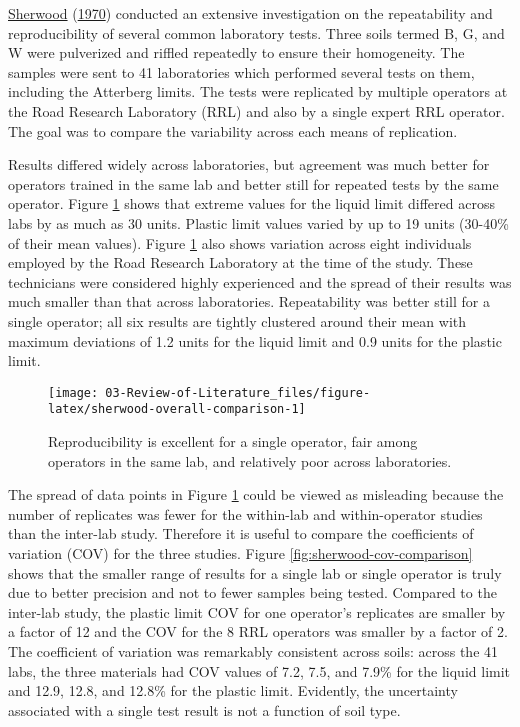 \documentclass[
  letterpaper,
  openany]{book}
\begin{document}
\protect\hyperlink{ref-Sherwood1970}{Sherwood} (\protect\hyperlink{ref-Sherwood1970}{1970}) conducted an extensive investigation on the repeatability and reproducibility of several common laboratory tests.
Three soils termed B, G, and W were pulverized and riffled repeatedly to ensure their homogeneity. The samples were sent to 41 laboratories which performed several tests on them, including the Atterberg limits.
The tests were replicated by multiple operators at the Road Research Laboratory (RRL) and also by a single expert RRL operator.
The goal was to compare the variability across each means of replication.

Results differed widely across laboratories, but agreement was much better for operators trained in the same lab and better still for repeated tests by the same operator.
Figure \ref{fig:sherwood-overall-comparison} shows that extreme values for the liquid limit differed across labs by as much as 30 units.
Plastic limit values varied by up to 19 units (30-40\% of their mean values).
Figure \ref{fig:sherwood-overall-comparison} also shows variation across eight individuals employed by the Road Research Laboratory at the time of the study.
These technicians were considered highly experienced and the spread of their results was much smaller than that across laboratories.
Repeatability was better still for a single operator; all six results are tightly clustered around their mean with maximum deviations of 1.2 units for the liquid limit and 0.9 units for the plastic limit.

\begin{figure}

{\centering \texttt{[image: 03-Review-of-Literature\_files/figure-latex/sherwood-overall-comparison-1]} 

}

\caption[Repeatability and reproducibility of Atterberg limit tests]{Reproducibility is excellent for a single operator, fair among operators in the same lab, and relatively poor across laboratories.}\label{fig:sherwood-overall-comparison}
\end{figure}

The spread of data points in Figure \ref{fig:sherwood-overall-comparison} could be viewed as misleading because the number of replicates was fewer for the within-lab and within-operator studies than the inter-lab study.
Therefore it is useful to compare the coefficients of variation (COV) for the three studies. Figure \ref{fig:sherwood-cov-comparison} shows that the smaller range of results for a single lab or single operator is truly due to better precision and not to fewer samples being tested. Compared to the inter-lab study, the plastic limit COV for one operator's replicates are smaller by a factor of 12 and the COV for the 8 RRL operators was smaller by a factor of 2.
The coefficient of variation was remarkably consistent across soils: across the 41 labs, the three materials had COV values of 7.2, 7.5, and 7.9\% for the liquid limit and 12.9, 12.8, and 12.8\% for the plastic limit.
Evidently, the uncertainty associated with a single test result is not a function of soil type.
\end{document}
